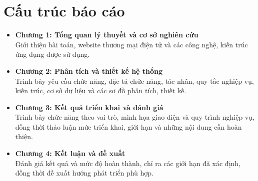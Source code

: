 \section{Cấu trúc báo cáo}
\begin{itemize}
    \item \textbf{Chương 1: Tổng quan lý thuyết và cơ sở nghiên cứu} \\
    Giới thiệu bài toán, website thương mại điện tử và các công nghệ, kiến trúc ứng dụng được sử dụng.
    
    \item \textbf{Chương 2: Phân tích và thiết kế hệ thống} \\
    Trình bày yêu cầu chức năng, đặc tả chức năng, tác nhân, quy tắc nghiệp vụ, kiến trúc, cơ sở dữ liệu và các sơ đồ phân tích, thiết kế.
    
    \item \textbf{Chương 3: Kết quả triển khai và đánh giá} \\
    Trình bày chức năng theo vai trò, minh họa giao diện và quy trình nghiệp vụ, đồng thời thảo luận mức triển khai, giới hạn và những nội dung cần hoàn thiện.
    
    \item \textbf{Chương 4: Kết luận và đề xuất} \\
    Đánh giá kết quả và mức độ hoàn thành, chỉ ra các giới hạn đã xác định, đồng thời đề xuất hướng phát triển phù hợp.
\end{itemize}
